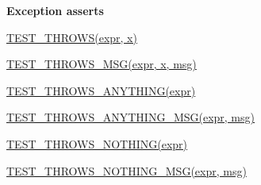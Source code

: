 {\bfseries Exception asserts}
\begin{DoxyItemize}
\item \hyperlink{cpptest-assert_8h_a5174c5f93519d5726c8993b2f36d6ceb}{T\+E\+S\+T\+\_\+\+T\+H\+R\+O\+W\+S(expr, x)}
\item \hyperlink{cpptest-assert_8h_a1ce6abe9e9134ce993840a648673e0f2}{T\+E\+S\+T\+\_\+\+T\+H\+R\+O\+W\+S\+\_\+\+M\+S\+G(expr, x, msg)}
\item \hyperlink{cpptest-assert_8h_a895af88056cd626a010136ac07b81d37}{T\+E\+S\+T\+\_\+\+T\+H\+R\+O\+W\+S\+\_\+\+A\+N\+Y\+T\+H\+I\+N\+G(expr)}
\item \hyperlink{cpptest-assert_8h_a052597a8fd7dbc40ba350c735c4517c5}{T\+E\+S\+T\+\_\+\+T\+H\+R\+O\+W\+S\+\_\+\+A\+N\+Y\+T\+H\+I\+N\+G\+\_\+\+M\+S\+G(expr, msg)}
\item \hyperlink{cpptest-assert_8h_a885a5f6b6decac47414b4cc1a0a66425}{T\+E\+S\+T\+\_\+\+T\+H\+R\+O\+W\+S\+\_\+\+N\+O\+T\+H\+I\+N\+G(expr)}
\item \hyperlink{cpptest-assert_8h_a758a47b613522a3d597c513786191ff9}{T\+E\+S\+T\+\_\+\+T\+H\+R\+O\+W\+S\+\_\+\+N\+O\+T\+H\+I\+N\+G\+\_\+\+M\+S\+G(expr, msg)} 
\end{DoxyItemize}